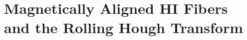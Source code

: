 \chapter[Magnetically Aligned HI Fibers and the Rolling Hough Transform]{Magnetically Aligned HI Fibers and the Rolling Hough Transform\label{ch:fibers_RHT}}
\let\thefootnote\relax{}

